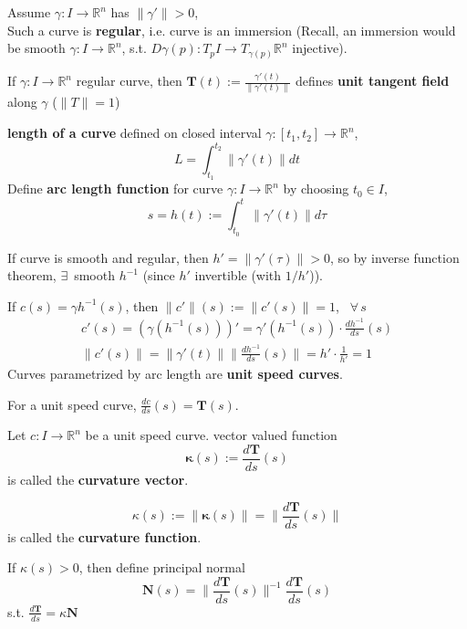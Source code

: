 Assume $\gamma : I \to \mathbb{R}^n$ has $\| \gamma' \| >0$, \\
Such a curve is \textbf{regular}, i.e. curve is an immersion (Recall, an immersion would be smooth $\gamma : I \to \mathbb{R}^n$, s.t. $D\gamma(p): T_p I \to T_{\gamma(p)}\mathbb{R}^n$ injective).  

\begin{definition}	
	If $\gamma:I \to \mathbb{R}^n$ regular curve, then $\mathbf{T}(t) := \frac{\gamma'(t)}{ \| \gamma'(t) \| }$ defines \textbf{unit tangent field} along $\gamma$ ($\|T \| = 1$)
\end{definition}

\textbf{length of a curve} defined on closed interval $\gamma :[t_1, t_2] \to \mathbb{R}^n$, 
\[
L  = \int_{t_1}^{t_2} \| \gamma'(t) \| dt
\]
Define \textbf{arc length function} for curve $\gamma:I \to \mathbb{R}^n$ by choosing $t_0 \in I$, 
\[
s = h(t) :=  \int_{t_0}^{t} \| \gamma'(t) \| d\tau
\]

If curve is smooth and regular, then $h'= \| \gamma'(\tau) \| >0$, so by inverse function theorem, $\exists \,$ smooth $h^{-1}$ (since $h'$ invertible (with $1/h'$)). 

If $c(s) = \gamma h^{-1}(s)$, then $\| c' \|(s) := \| c'(s)\| = 1$, \, $\forall \, s$
\[
\begin{gathered} 
c'(s) = (\gamma(h^{-1}(s)))' = \gamma'(h^{-1}(s)) \cdot \frac{dh^{-1}}{ds}(s) \\
\| c'(s) \| = \| \gamma'(t) \| \| \frac{dh^{-1}}{ds} (s) \| = h' \cdot \frac{1}{h'} = 1
\end{gathered} 
\]
Curves parametrized by arc length are \textbf{unit speed curves}.


For a unit speed curve, $\frac{dc}{ds}(s) = \mathbf{T}(s)$. 

\begin{definition}
	Let $c:I \to \mathbb{R}^n$ be a unit speed curve. vector valued function
	\[
	\mathbf{\kappa}(s) := \frac{d\mathbf{T}}{ds}(s) 
	\]
	is called the \textbf{curvature vector}.
	
	\[
	\kappa(s) := \| \mathbf{\kappa}(s) \| = \| \frac{d\mathbf{T}}{ds}(s) \|
	\]
	is called the \textbf{curvature function}.

	If $\kappa(s) >0$, then define principal normal
	\[
	\mathbf{N}(s) = \| \frac{d\mathbf{T}}{ds}(s) \|^{-1} \frac{d\mathbf{T}}{ds}(s) 
	\]
	s.t. $\frac{d\mathbf{T}}{ds} = \kappa \mathbf{N}$
\end{definition}

